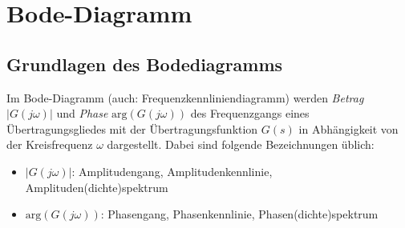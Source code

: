\FloatBarrier
{}

\section{Bode-Diagramm}



\subsection{Grundlagen des Bodediagramms} \label{sec:grundlagen:bode}
Im Bode-Diagramm (auch: Frequenzkennliniendiagramm) werden \emph{Betrag} $|G(j \omega)|$ und \emph{Phase} $\text{arg}(G(j\omega))$ des Frequenzgangs eines Übertragungsgliedes mit der Übertragungsfunktion $G(s)$ in Abhängigkeit von der Kreisfrequenz $\omega$ dargestellt. Dabei sind folgende Bezeichnungen üblich:
\begin{itemize}
    \item $|G(j \omega)|$: Amplitudengang, Amplitudenkennlinie, Amplituden(dichte)spektrum
    \item $\text{arg}(G(j\omega))$: Phasengang, Phasenkennlinie, Phasen(dichte)spektrum
\end{itemize}


